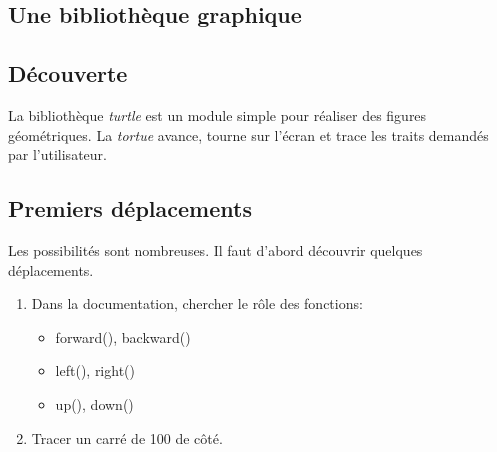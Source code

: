 \documentclass[a4paper,11pt]{article}
\begin{document}
\begin{Form}
\section{Une bibliothèque graphique}
\subsection{Découverte}
La bibliothèque \emph{turtle} est un module simple pour réaliser des figures géométriques. La \emph{tortue} avance, tourne sur l'écran et trace les traits demandés par l'utilisateur.
\subsection{Premiers déplacements}
Les possibilités sont nombreuses. Il faut d'abord découvrir quelques déplacements.
\begin{activite}
\begin{enumerate}
\item Dans la documentation, chercher le rôle des fonctions:
\begin{itemize}
\item forward(), backward()
\item left(), right()
\item up(), down()
\end{itemize}
\item Tracer un carré de 100 de côté.
\end{enumerate}
\end{activite}

\end{Form}
\end{document}
